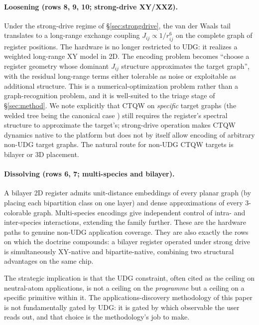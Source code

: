 \documentclass[10pt]{article}
\begin{document}
\paragraph{Loosening (rows 8, 9, 10; strong-drive XY/XXZ).}
Under the strong-drive regime of \S\ref{sec:strongdrive}, the van der Waals tail translates to a long-range exchange coupling $J_{ij} \propto 1/r_{ij}^6$ on the complete graph of register positions. The hardware is no longer restricted to UDG: it realizes a weighted long-range XY model in 2D. The encoding problem becomes ``choose a register geometry whose dominant $J_{ij}$ structure approximates the target graph'', with the residual long-range terms either tolerable as noise or exploitable as additional structure. This is a numerical-optimization problem rather than a graph-recognition problem, and it is well-suited to the triage stage of \S\ref{sec:method}. We note explicitly that CTQW on \emph{specific} target graphs (the welded tree being the canonical case \cite{childs2003exponential}) still requires the register's spectral structure to approximate the target's; strong-drive operation makes CTQW dynamics native to the platform but does not by itself allow encoding of arbitrary non-UDG target graphs. The natural route for non-UDG CTQW targets is bilayer or 3D placement.

\paragraph{Dissolving (rows 6, 7; multi-species and bilayer).}
A bilayer 2D register admits unit-distance embeddings of every planar graph (by placing each bipartition class on one layer) and dense approximations of every 3-colorable graph. Multi-species encodings give independent control of intra- and inter-species interactions, extending the family further. These are the hardware paths to genuine non-UDG application coverage. They are also exactly the rows on which the doctrine compounds: a bilayer register operated under strong drive is simultaneously XY-native and bipartite-native, combining two structural advantages on the same chip.

The strategic implication is that the UDG constraint, often cited as the ceiling on neutral-atom applications, is not a ceiling on the \emph{programme} but a ceiling on a specific primitive within it. The applications-discovery methodology of this paper is not fundamentally gated by UDG: it is gated by which observable the user reads out, and that choice is the methodology's job to make.
\end{document}
